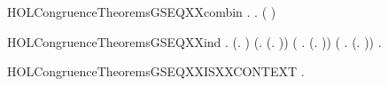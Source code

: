 \begin{SaveVerbatim}{HOLCongruenceTheoremsGSEQXXcombin}
\HOLTokenTurnstile{} \HOLSymConst{\HOLTokenForall{}}.   \HOLSymConst{\HOLTokenImp{}} \HOLSymConst{\HOLTokenForall{}}.   \HOLSymConst{\HOLTokenImp{}}  ( \HOLConst{\HOLTokenCompose} )
\end{SaveVerbatim}
\newcommand{\HOLCongruenceTheoremsGSEQXXcombin}{\UseVerbatim{HOLCongruenceTheoremsGSEQXXcombin}}
\begin{SaveVerbatim}{HOLCongruenceTheoremsGSEQXXind}
\HOLTokenTurnstile{} \HOLSymConst{\HOLTokenForall{}}.
        (\HOLTokenLambda{}. ) \HOLSymConst{\HOLTokenConj{}} (\HOLSymConst{\HOLTokenForall{}}.  (\HOLTokenLambda{}. )) \HOLSymConst{\HOLTokenConj{}}
       (\HOLSymConst{\HOLTokenForall{}} .   \HOLSymConst{\HOLTokenImp{}}  (\HOLTokenLambda{}.  )) \HOLSymConst{\HOLTokenConj{}}
       (\HOLSymConst{\HOLTokenForall{}}   .
              \HOLSymConst{\HOLTokenConj{}}   \HOLSymConst{\HOLTokenImp{}}
             (\HOLTokenLambda{}.   \HOLSymConst{\ensuremath{+}}  )) \HOLSymConst{\HOLTokenImp{}}
       \HOLSymConst{\HOLTokenForall{}}.   \HOLSymConst{\HOLTokenImp{}}  
\end{SaveVerbatim}
\newcommand{\HOLCongruenceTheoremsGSEQXXind}{\UseVerbatim{HOLCongruenceTheoremsGSEQXXind}}
\begin{SaveVerbatim}{HOLCongruenceTheoremsGSEQXXISXXCONTEXT}
\HOLTokenTurnstile{} \HOLSymConst{\HOLTokenForall{}}.   \HOLSymConst{\HOLTokenImp{}}  
\end{SaveVerbatim}
